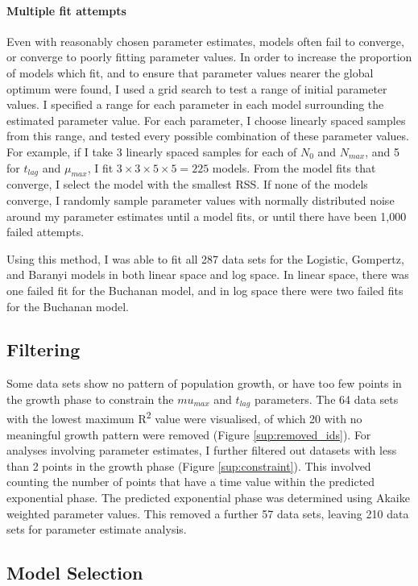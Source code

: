 \documentclass[11pt, a4paper]{article}
\begin{document}
\begin{linenumbers}
     

\paragraph{Multiple fit attempts}
Even with reasonably chosen parameter estimates, models often fail to converge, or converge to poorly fitting parameter values. In order to increase the proportion of models which fit, and to ensure that parameter values nearer the global optimum were found, I used a grid search to test a range of initial parameter values. I specified a range for each parameter in each model surrounding the estimated parameter value. For each parameter, I choose linearly spaced samples from this range, and tested every possible combination of these parameter values. For example, if I take 3 linearly spaced samples for each of $N_0$ and $N_{max}$, and 5 for $t_{lag}$ and $\mu_{max}$, I fit $3 \times 3 \times 5 \times 5 = 225$ models. From the model fits that converge, I select the model with the smallest RSS. If none of the models converge, I randomly sample parameter values with normally distributed noise around my parameter estimates until a model fits, or until there have been 1,000 failed attempts. 

Using this method, I was able to fit all 287 data sets for the Logistic, Gompertz, and Baranyi models in both linear space and log space. In linear space, there was one failed fit for the Buchanan model, and in log space there were two failed fits for the Buchanan model.


\subsection{Filtering}
Some data sets show no pattern of population growth, or have too few points in the growth phase to constrain the $mu_{max}$ and $t_{lag}$ parameters. The 64 data sets with the lowest maximum R\textsuperscript{2} value were visualised, of which 20 with no meaningful growth pattern were removed (Figure \ref{sup:removed_ids}). For analyses involving parameter estimates, I further filtered out datasets with less than 2 points in the growth phase (Figure \ref{sup:constraint}).  This involved counting the number of points that have a time value within the predicted exponential phase. The predicted exponential phase was determined using Akaike weighted parameter values. This removed a further 57 data sets, leaving 210 data sets for parameter estimate analysis.


\subsection{Model Selection}


\end{linenumbers}
\end{document}
